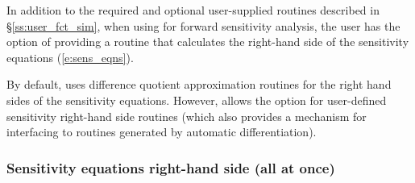 In addition to the required and optional user-supplied routines described
in \S\ref{ss:user_fct_sim}, when using {\cvodes} for forward sensitivity analysis,
the user has the option of providing a routine that calculates the right-hand side 
of the sensitivity equations (\ref{e:sens_eqns}).

By default, {\cvodes} uses difference quotient approximation routines for the right
hand sides of the sensitivity equations.
However, {\cvodes} allows the option for user-defined sensitivity right-hand side routines
(which also provides a mechanism for interfacing {\cvodes} to routines
generated by automatic differentiation).

\subsubsection{Sensitivity equations right-hand side (all at once)}


